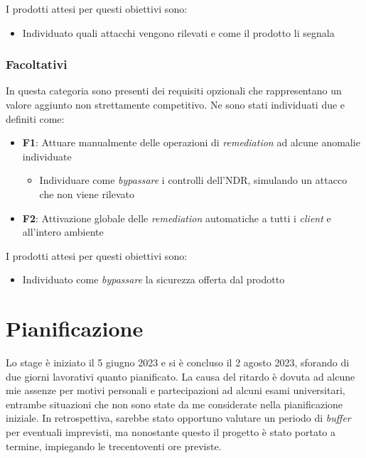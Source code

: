 I prodotti attesi per questi obiettivi sono:

\begin{itemize}
    \item Individuato quali attacchi vengono rilevati e come il prodotto li segnala
\end{itemize}

\subsubsection{Facoltativi}

In questa categoria sono presenti dei requisiti opzionali che rappresentano un valore aggiunto non strettamente competitivo. Ne sono stati individuati due e definiti come:

\begin{itemize}
    \item \textbf{F1}: Attuare manualmente delle operazioni di \emph{remediation} ad alcune anomalie individuate
    \begin{itemize}
        \item Individuare come \emph{bypassare} i controlli dell'NDR, simulando un attacco che non viene rilevato
    \end{itemize}
    \item \textbf{F2}: Attivazione globale delle \emph{remediation} automatiche a tutti i \emph{client} e all'intero ambiente
\end{itemize}

I prodotti attesi per questi obiettivi sono:

\begin{itemize}
    \item Individuato come \emph{bypassare} la sicurezza offerta dal prodotto
\end{itemize}

\section{Pianificazione}
\label{sec:pianificazione}

Lo stage è iniziato il 5 giugno 2023 e si è concluso il 2 agosto 2023, sforando di due giorni lavorativi quanto pianificato. La causa del ritardo è dovuta ad alcune mie assenze per motivi personali e partecipazioni ad alcuni esami universitari, entrambe situazioni che non sono state da me considerate nella pianificazione iniziale. In retrospettiva, sarebbe stato opportuno valutare un periodo di \emph{buffer} per eventuali imprevisti, ma nonostante questo il progetto è stato portato a termine, impiegando le trecentoventi ore previste.

